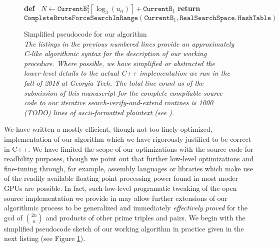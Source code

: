 \documentclass[12pt]{article}
\begin{document}
\begin{figure}[ht!]
\begin{algorithm}[H]
     \textbf{def\ } $N \longleftarrow \mathtt{CurrentB}_1^2 \left\lceil \log_3(u_{\alpha}) \right\rceil + 
                     \mathtt{CurrentB}_1$\; 
     \BlankLine
     \textbf{return\ } $\mathtt{CompleteBruteForceSearchInRange}(\mathtt{CurrentB}_1, 
                                               \mathtt{RealSearchSpace}, \mathtt{HashTable})$\;
\end{algorithm} 

\caption{Simplified pseudocode for our algorithm \\ 
             \em The listings in the previous numbered lines provide an approximately C-like 
             algorithmic syntax for the description of our working procedure. 
             Where possible, we have simplified or abstracted the lower-level details to the 
             actual C++ implementation we ran in the fall of 2018 at Georgia Tech. 
             The total line count as of the submission of this manuscript for the complete 
             compilable source code to our iterative search-verify-and-extend routines is 
             1000 (TODO) lines of ascii-formatted plaintext (see \cite{105-PROBLEM-GITHUBREPO}).} 
\label{figure_AlgPseudoCode} 

\end{figure} 

We have written a mostly efficient, though not too finely optimized, implementation of our 
algorithm which we have rigorously justified to be correct in C++. We have limited the scope of 
our optimizations with the source code for readbility purposes, though we point out that further 
low-level optimizations and fine-tuning through, for example, assembly languages or libraries which 
make use of the readily available floating point processing power found in most moder GPUs are possible. 
In fact, such low-level programatic tweaking of the open source implementation we provide in 
\cite{105-PROBLEM-GITHUBREPO} may allow further extensions of our algorithmic process to be 
generalized and immediately \emph{effectively proved} for the gcd of $\binom{2n}{n}$ and products of 
other prime triples and pairs. We begin with the simplified pseudocode sketch of our working 
algorithm in practice given in the next listing (see Figure \ref{figure_AlgPseudoCode}). 
\end{document}
